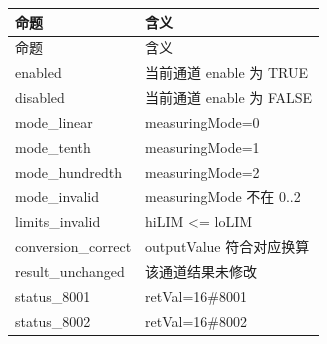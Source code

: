 \begin{longtable}{L{3.3cm}L{10.0cm}}

\toprule

命题 & 含义\\

\midrule

\endfirsthead

\toprule

命题 & 含义\\

\midrule

\endhead

{\ttfamily enabled} & 当前通道 enable 为 TRUE\\

{\ttfamily disabled} & 当前通道 enable 为 FALSE\\

{\ttfamily mode\_linear} & measuringMode=0\\

{\ttfamily mode\_tenth} & measuringMode=1\\

{\ttfamily mode\_hundredth} & measuringMode=2\\

{\ttfamily mode\_invalid} & measuringMode 不在 0..2\\

{\ttfamily limits\_invalid} & hiLIM <= loLIM\\

{\ttfamily conversion\_correct} & outputValue 符合对应换算\\

{\ttfamily result\_unchanged} & 该通道结果未修改\\

{\ttfamily status\_8001} & retVal=16\#8001\\

{\ttfamily status\_8002} & retVal=16\#8002\\

\bottomrule

\end{longtable}

